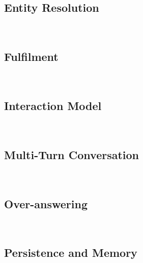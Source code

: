 	\subsection*{Entity Resolution}~\label{entityRes:def}	
	
	\subsection*{Fulfilment}~\label{fulfillment:def}
	
	\subsection*{Interaction Model}~\label{interactionMdl:def}
	
	\subsection*{Multi-Turn Conversation}~\label{multiturn:def}
	
	\subsection*{Over-answering}~\label{overanswering:def}

	\subsection*{Persistence and Memory}~\label{memory:def}

%	










